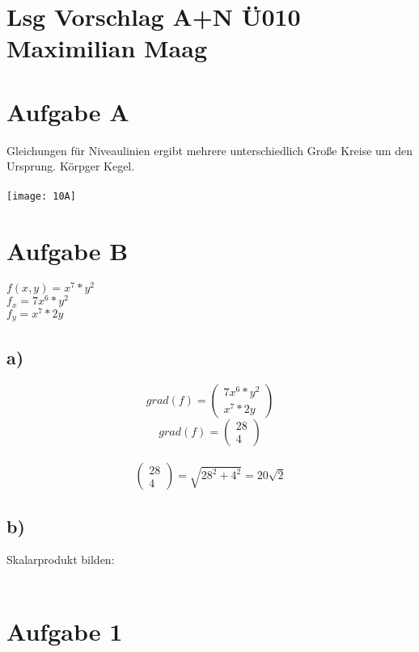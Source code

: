 \documentclass{article}
\begin{document}
	\section*{Lsg Vorschlag A+N Ü010 Maximilian Maag}
	\section*{Aufgabe A}
	Gleichungen für Niveaulinien ergibt mehrere unterschiedlich Große Kreise um den Ursprung. Körpger Kegel. \\ \\
	\texttt{[image: 10A]}
	\section*{Aufgabe B}
	$f(x,y) = x^7 * y^2$ \\
	$f_x = 7x^6 * y^2$ \\
	$f_y = x^7 * 2y$ 
	\subsection*{a)}
	\[grad(f) = \begin{pmatrix}
		7x^6 * y^2 \\ x^7 * 2y
	\end{pmatrix}
	 \]
	\[grad(f) = \begin{pmatrix}
		28 \\ 4
	\end{pmatrix}\] \\
	\[\begin{pmatrix}
		28 \\ 4
	\end{pmatrix} = \sqrt{28^2 + 4^2} = 20\sqrt{2} \]
	\subsection*{b)}
	Skalarprodukt bilden: \\ \\
	\section*{Aufgabe 1}
\end{document}
